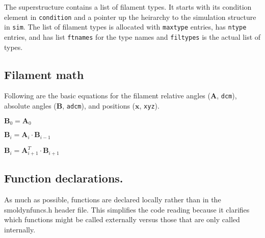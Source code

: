 \documentclass {scrbook}
\newcommand {\ttt} {\texttt}
\begin{document}
The superstructure contains a list of filament types. It starts with its condition element in \ttt{condition} and a pointer up the heirarchy to the simulation structure in \ttt{sim}. The list of filament types is allocated with \ttt{maxtype} entries, has \ttt{ntype} entries, and has list \ttt{ftnames} for the type names and \ttt{filtypes} is the actual list of types.\\

\subsection*{Filament math}

Following are the basic equations for the filament relative angles ($\mathbf{A}$, \ttt{dcm}), absolute angles ($\mathbf{B}$, \ttt{adcm}), and positions ($\mathbf{x}$, \ttt{xyz}).

\begin{math}
\mathbf{B}_0 = \mathbf{A}_0
\end{math}

\begin{math}
\mathbf{B}_i = \mathbf{A}_i \cdot \mathbf{B}_{i-1}
\end{math}

\begin{math}
\mathbf{B}_i = \mathbf{A}^T_{i+1} \cdot \mathbf{B}_{i+1}
\end{math}

\subsection*{Function declarations.}
As much as possible, functions are declared locally rather than in the smoldynfuncs.h header file. This simplifies the code reading because it clarifies which functions might be called externally versus those that are only called internally.
\end{document}
